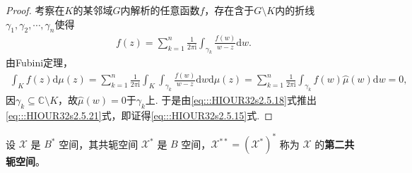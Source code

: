 \documentclass[../../main.tex]{subfiles}%
\begin{document}
\begin{proof}
考察在$K$的某邻域$G$内解析的任意函数$f$，存在含于$G\setminus K$内的折线$\gamma_1,\gamma_2,\cdots,\gamma_n$使得
\begin{align*}
f(z)=\sum\limits_{k=1}^{n}\frac{1}{2\pi\mathrm{i}}\int_{\gamma_k}\frac{f(w)}{w-z}\mathrm{d}w.
\end{align*}
由Fubini定理，
\begin{align}
\int_{K}f(z)\mathrm{d}\mu(z)=\sum\limits_{k=1}^{n}\frac{1}{2\pi\mathrm{i}}\int_{K}\int_{\gamma_k}\frac{f(w)}{w-z}\mathrm{d}w\mathrm{d}\mu(z)
=\sum\limits_{k=1}^{n}\frac{1}{2\pi\mathrm{i}}\int_{\gamma_k}f(w)\wideparen{\mu}(w)\mathrm{d}w=0, \label{eq:::HIOUR32s2.5.21}
\end{align}
因$\gamma_k\subseteq\mathbb{C}\setminus K$，故$\wideparen{\mu}(w)=0$于$\gamma_k$上. 于是由\eqref{eq:::HIOUR32s2.5.18}式推出\eqref{eq:::HIOUR32s2.5.21}式，即证得\eqref{eq:::HIOUR32s2.5.15}式.
\end{proof}

\begin{definition}
设 $\mathscr{X}$ 是 $B^*$ 空间，其共轭空间 $\mathscr{X}^*$ 是 $B$ 空间，$\mathscr{X}^{**} = (\mathscr{X}^*)^*$ 称为 $\mathscr{X}$ 的\textbf{第二共轭空间}。
\end{definition}
\end{document}
